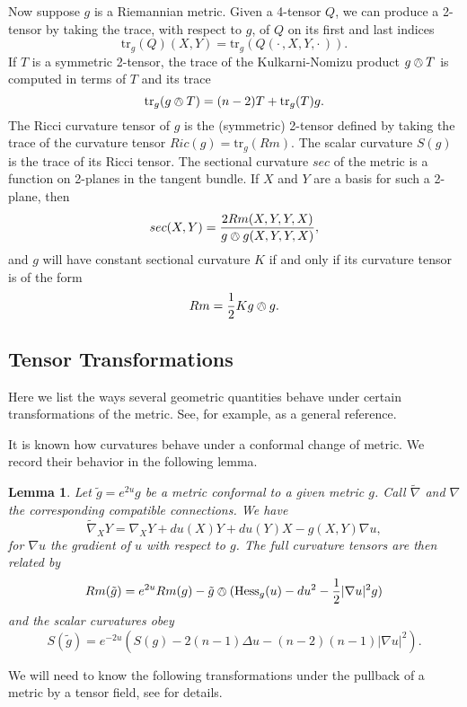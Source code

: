 \documentclass{amsart}
\newcommand{\tr}{\mathrm{tr}}
\newtheorem{lem}[thm]{Lemma}
\begin{document}
Now suppose $g$ is a Riemannian metric.
Given a 4-tensor $Q$, we can produce a 2-tensor by taking the trace, with respect to $g$, of $Q$ on its first and last indices
\[
\tr_g(Q)(X,Y) = \tr_g( Q(\cdot \, , X,Y, \cdot \,)).
\]
If $T$ is a symmetric 2-tensor, the trace of the Kulkarni-Nomizu product $g \owedge T$ is computed in terms of $T$ and its trace
\begin{equation}
\label{TraceKN}
\tr_g( g \owedge T) = (n-2)T + \tr_g(T)g.
\end{equation}
The Ricci curvature tensor of $g$ is the (symmetric) 2-tensor defined by taking the trace of the curvature tensor $Ric(g) = \tr_g(Rm)$.
The scalar curvature $S(g)$ is the trace of its Ricci tensor.
The sectional curvature $sec$ of the metric is a function on 2-planes in the tangent bundle. 
If $X$ and $Y$ are a basis for such a 2-plane, then
\[
sec(X,Y) = \frac{2Rm(X,Y,Y,X)}{g \owedge g(X,Y,Y,X)},
\]
and $g$ will have constant sectional curvature $K$ if and only if its curvature tensor is of the form 
\[
Rm = \frac{1}{2}K g \owedge g.
\]

\subsection{Tensor Transformations}

Here we list the ways several geometric quantities behave under certain transformations of the metric.
See, for example, \cite{Lee2018} as a general reference.

It is known how curvatures behave under a conformal change of metric.
We record their behavior in the following lemma.


\begin{lem}
\label{ConfChange}
Let $\tilde{g} = e^{2u}g$ be a metric conformal to a given metric $g$.
Call $\widetilde{\nabla}$ and $\nabla$ the corresponding compatible connections.
We have 
\[
\widetilde{\nabla}_XY = \nabla_XY + du(X)Y + du(Y)X - g(X,Y)\nabla u,
\]
for $\nabla u$ the gradient of $u$ with respect to $g$.
The full curvature tensors are then related by
\[
Rm(\tilde{g}) = e^{2u}Rm(g) - \tilde{g}\owedge(\mathrm{Hess}_g(u) - du^2 - \frac{1}{2}|\nabla u|^2g)
\]
and the scalar curvatures obey
\[
S(\tilde{g}) = e^{-2u}(S(g) -2(n-1)\Delta u  - (n-2)(n-1)|\nabla u|^2).
\]
\end{lem}

We will need to know the following transformations under the pullback of a metric by a tensor field, see \cite{Bridgeman-Bromberg2022} for details.
\end{document}

